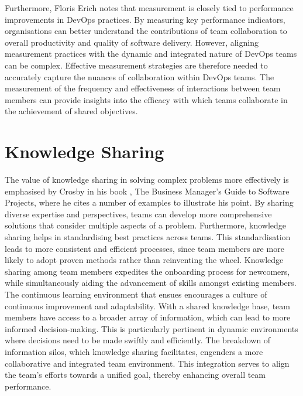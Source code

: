 Furthermore, Floris Erich \cite{Erich2017DevOps} notes that measurement is closely tied to performance improvements in DevOps practices. By measuring key performance indicators, organisations can better understand the contributions of team collaboration to overall productivity and quality of software delivery. However, aligning measurement practices with the dynamic and integrated nature of DevOps teams can be complex. Effective measurement strategies are therefore needed to accurately capture the nuances of collaboration within DevOps teams. The measurement of the frequency and effectiveness of interactions between team members can provide insights into the efficacy with which teams collaborate in the achievement of shared objectives.


\section{Knowledge Sharing}


The value of knowledge sharing in solving complex problems more effectively is emphasised by Crosby in his book \cite{Crosby2023}, The Business Manager's Guide to Software Projects, where he cites a number of examples to illustrate his point. By sharing diverse expertise and perspectives, teams can develop more comprehensive solutions that consider multiple aspects of a problem. Furthermore, knowledge sharing helps in standardising best practices across teams. This standardisation leads to more consistent and efficient processes, since team members are more likely to adopt proven methods rather than reinventing the wheel. Knowledge sharing among team members expedites the onboarding process for newcomers, while simultaneously aiding the advancement of skills amongst existing members. The continuous learning environment that ensues encourages a culture of continuous improvement and adaptability. With a shared knowledge base, team members have access to a broader array of information, which can lead to more informed decision-making. This is particularly pertinent in dynamic environments where decisions need to be made swiftly and efficiently. The breakdown of information silos, which knowledge sharing facilitates, engenders a more collaborative and integrated team environment. This integration serves to align the team's efforts towards a unified goal, thereby enhancing overall team performance.


